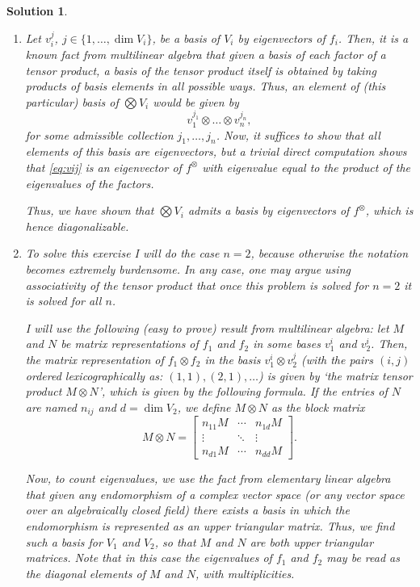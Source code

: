 \documentclass{article}
\theoremstyle{nonumberplain}
\newtheorem{sol}{Solution}
\begin{document}
\begin{sol}
\begin{enumerate}
\item Let $v_i^j$, $j \in \{1, \dots, \dim V_i\}$, be a basis of $V_i$ by eigenvectors of $f_i$. Then, it is a known fact from multilinear algebra that given a basis of each factor of a tensor product, a basis of the tensor product itself is obtained by taking products of basis elements in all possible ways. Thus, an element of (this particular) basis of $\bigotimes V_i$ would be given by
\begin{equation}\label{eq:vij}
v_1^{j_1} \otimes \dots \otimes v_n^{j_n},
\end{equation}
for some admissible collection $j_1, \dots, j_n$. Now, it suffices to show that all elements of this basis are eigenvectors, but a trivial direct computation shows that \eqref{eq:vij} is an eigenvector of $f^\otimes$ with eigenvalue equal to the product of the eigenvalues of the factors.

Thus, we have shown that $\bigotimes V_i$ admits a basis by eigenvectors of $f^\otimes$, which is hence diagonalizable.

\item To solve this exercise I will do the case $n = 2$, because otherwise the notation becomes extremely burdensome. In any case, one may argue using associativity of the tensor product that once this problem is solved for $n = 2$ it is solved for all $n$.

I will use the following (easy to prove) result from multilinear algebra: let $M$ and $N$ be matrix representations of $f_1$ and $f_2$ in some bases $v_1^i$ and $v_2^i$. Then, the matrix representation of $f_1 \otimes f_2$ in the basis $v_1^i \otimes v_2^j$ (with the pairs $(i,j)$ ordered lexicographically as: $(1,1), (2,1), \dots$) is given by `the matrix tensor product $M \otimes N$', which is given by the following formula. If the entries of $N$ are named $n_{ij}$ and $d = \dim V_2$, we define $M \otimes N$ as the block matrix
\begin{equation}
M \otimes N = \begin{bmatrix}
n_{11} M & \cdots & n_{1d} M \\
\vdots & \ddots & \vdots \\
n_{d1} M & \cdots & n_{dd} M
\end{bmatrix}.
\end{equation}

Now, to count eigenvalues, we use the fact from elementary linear algebra that given any endomorphism of a complex vector space (or any vector space over an algebraically closed field) there exists a basis in which the endomorphism is represented as an upper triangular matrix. Thus, we find such a basis for $V_1$ and $V_2$, so that $M$ and $N$ are both upper triangular matrices. Note that in this case the eigenvalues of $f_1$ and $f_2$ may be read as the diagonal elements of $M$ and $N$, with multiplicities.


\end{enumerate}
\end{sol}
\end{document}

